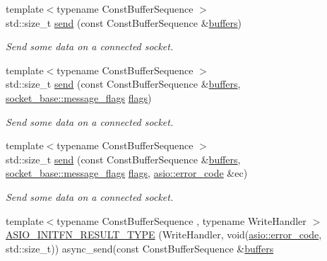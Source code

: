\begin{DoxyCompactItemize}
{\footnotesize template$<$typename Const\+Buffer\+Sequence $>$ }\\std\+::size\+\_\+t \hyperlink{classasio_1_1basic__datagram__socket_a40321a648df7c6f87ef06f657d4e9f60}{send} (const Const\+Buffer\+Sequence \&\hyperlink{group__async__read_ga54dede45c3175148a77fe6635222c47d}{buffers})
\begin{DoxyCompactList}\small\item\em Send some data on a connected socket. \end{DoxyCompactList}\item 
{\footnotesize template$<$typename Const\+Buffer\+Sequence $>$ }\\std\+::size\+\_\+t \hyperlink{classasio_1_1basic__datagram__socket_aa43fc2a432bb8efbddb1d89939dbe952}{send} (const Const\+Buffer\+Sequence \&\hyperlink{group__async__read_ga54dede45c3175148a77fe6635222c47d}{buffers}, \hyperlink{classasio_1_1socket__base_ac3cf77465dfedfe1979b5415cf32cc94}{socket\+\_\+base\+::message\+\_\+flags} \hyperlink{classasio_1_1basic__datagram__socket_a787b917059f9c50a483196d3edaf800c}{flags})
\begin{DoxyCompactList}\small\item\em Send some data on a connected socket. \end{DoxyCompactList}\item 
{\footnotesize template$<$typename Const\+Buffer\+Sequence $>$ }\\std\+::size\+\_\+t \hyperlink{classasio_1_1basic__datagram__socket_ac5dda5c9cef56adccc2aea5bea52e5ba}{send} (const Const\+Buffer\+Sequence \&\hyperlink{group__async__read_ga54dede45c3175148a77fe6635222c47d}{buffers}, \hyperlink{classasio_1_1socket__base_ac3cf77465dfedfe1979b5415cf32cc94}{socket\+\_\+base\+::message\+\_\+flags} \hyperlink{classasio_1_1basic__datagram__socket_a787b917059f9c50a483196d3edaf800c}{flags}, \hyperlink{classasio_1_1error__code}{asio\+::error\+\_\+code} \&ec)
\begin{DoxyCompactList}\small\item\em Send some data on a connected socket. \end{DoxyCompactList}\item 
{\footnotesize template$<$typename Const\+Buffer\+Sequence , typename Write\+Handler $>$ }\\\hyperlink{classasio_1_1basic__datagram__socket_aedcc367a0e25bdb0ea80ee2f1545290a}{A\+S\+I\+O\+\_\+\+I\+N\+I\+T\+F\+N\+\_\+\+R\+E\+S\+U\+L\+T\+\_\+\+T\+Y\+P\+E} (Write\+Handler, void(\hyperlink{classasio_1_1error__code}{asio\+::error\+\_\+code}, std\+::size\+\_\+t)) async\+\_\+send(const Const\+Buffer\+Sequence \&\hyperlink{group__async__read_ga54dede45c3175148a77fe6635222c47d}{buffers}

\end{DoxyCompactItemize}
